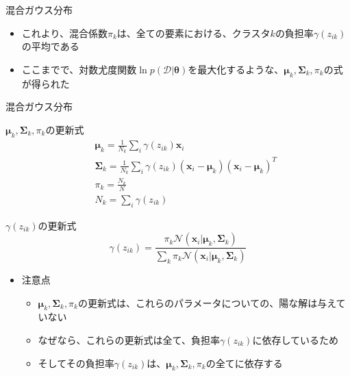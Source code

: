 \documentclass[dvipdfmx,notheorems,t]{beamer}
\begin{document}
\begin{frame}{混合ガウス分布}
\begin{itemize}
\begin{itemize}
		\item これより、混合係数$\pi_k$は、全ての要素における、クラスタ$k$の負担率$\gamma(z_{ik})$の平均である
		\newline
		\item \color{red}ここまでで、対数尤度関数$\ln p(\mathcal{D} | \bm{\theta})$を最大化するような、$\bm{\mu}_k, \bm{\Sigma}_k, \pi_k$の式が得られた\normalcolor
	\end{itemize}
\end{itemize}

\end{frame}

\begin{frame}{混合ガウス分布}

\begin{block}{$\bm{\mu}_k, \bm{\Sigma}_k, \pi_k$の更新式}
	\begin{eqnarray}
		&& \bm{\mu}_k = \frac{1}{N_k} \sum_i \gamma(z_{ik}) \bm{x}_i \\
		&& \bm{\Sigma}_k = \frac{1}{N_k} \sum_i \gamma(z_{ik}) (\bm{x}_i - \bm{\mu}_k) (\bm{x}_i - \bm{\mu}_k)^T \\
		&& \pi_k = \frac{N_k}{N} \\
		&& N_k = \sum_i \gamma(z_{ik})
	\end{eqnarray}
\end{block}

\begin{block}{$\gamma(z_{ik})$の更新式}
	\begin{equation}
		\gamma(z_{ik}) = \frac{\pi_k \mathcal{N}(\bm{x}_i | \bm{\mu}_k, \bm{\Sigma}_k)}{\sum_k \pi_k \mathcal{N}(\bm{x}_i | \bm{\mu}_k, \bm{\Sigma}_k)}
	\end{equation}
\end{block}

\begin{itemize}
	\item 注意点
	\begin{itemize}
		\item $\bm{\mu}_k, \bm{\Sigma}_k, \pi_k$の更新式は、これらのパラメータについての、\alert{陽な解は与えていない}
		\item なぜなら、これらの更新式は全て、負担率$\gamma(z_{ik})$に依存しているため
		\item そしてその負担率$\gamma(z_{ik})$は、$\bm{\mu}_k, \bm{\Sigma}_k, \pi_k$の全てに依存する
	\end{itemize}
\end{itemize}

\end{frame}
\end{document}
